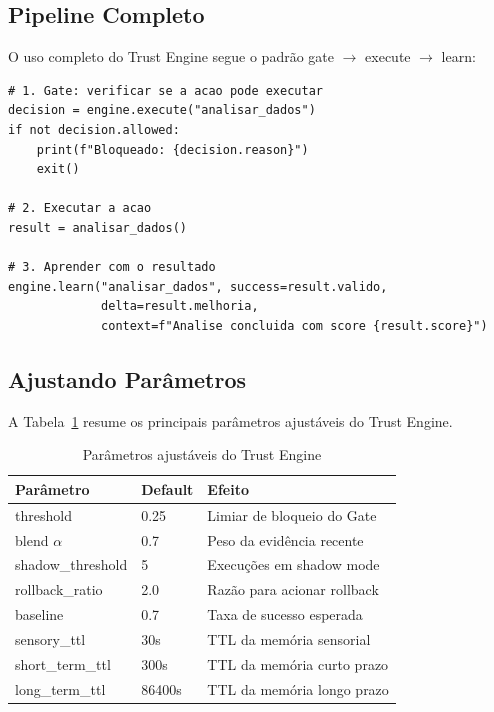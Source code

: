 \subsection{Pipeline Completo}

O uso completo do Trust Engine segue o padrão gate $\to$ execute
$\to$ learn:

\begin{lstlisting}[style=pythonstyle]
# 1. Gate: verificar se a acao pode executar
decision = engine.execute("analisar_dados")
if not decision.allowed:
    print(f"Bloqueado: {decision.reason}")
    exit()

# 2. Executar a acao
result = analisar_dados()

# 3. Aprender com o resultado
engine.learn("analisar_dados", success=result.valido,
             delta=result.melhoria,
             context=f"Analise concluida com score {result.score}")
\end{lstlisting}

\subsection{Ajustando Parâmetros}

A Tabela~\ref{tab:parametros-trust-engine} resume os principais
parâmetros ajustáveis do Trust Engine.

\begin{table}[htb]
\centering
\caption{Parâmetros ajustáveis do Trust Engine}
\label{tab:parametros-trust-engine}
\begin{tabular}{lll}
\toprule
\textbf{Parâmetro} & \textbf{Default} & \textbf{Efeito} \\
\midrule
threshold & 0.25 & Limiar de bloqueio do Gate \\
blend $\alpha$ & 0.7 & Peso da evidência recente \\
shadow\_threshold & 5 & Execuções em shadow mode \\
rollback\_ratio & 2.0 & Razão para acionar rollback \\
baseline & 0.7 & Taxa de sucesso esperada \\
sensory\_ttl & 30s & TTL da memória sensorial \\
short\_term\_ttl & 300s & TTL da memória curto prazo \\
long\_term\_ttl & 86400s & TTL da memória longo prazo \\
\bottomrule
\end{tabular}
\end{table}

